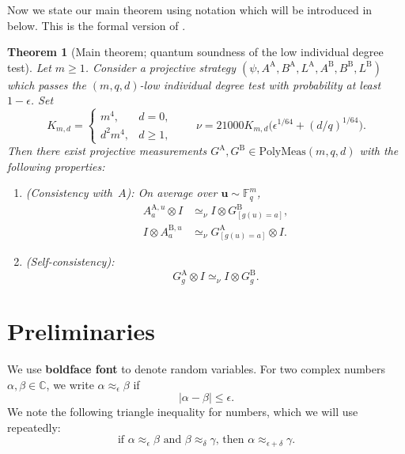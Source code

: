 \documentclass[11pt]{article}
\newtheorem{theorem}{Theorem}[section]
\theoremstyle{definition}
\newcommand{\C}{\mathbb C}
\newcommand{\F}{\mathbb F}
\newcommand{\eps}{\epsilon}
\newcommand{\ot}{\otimes}
\newcommand{\bu}{\boldsymbol{u}}
\newcommand{\polymeas}[3]{\mathrm{PolyMeas}(#1, #2, #3)}
\begin{document}
Now we state our main theorem using notation which will be introduced in  below.
This is the formal version of .

\begin{theorem}[Main theorem; quantum soundness of the low individual degree test]\label{thm:main-formal}
  Let $m\geq1$.  Consider a projective strategy $(\psi, A^{\mathrm{A}},B^{\mathrm{A}},L^{\mathrm{A}},A^{\mathrm{B}},B^{\mathrm{B}},L^{\mathrm{B}})$
   which passes the  $(m,q,d)$-low individual degree test with probability at least $1-\eps$.
  Set
  \[
  K_{m,d}=
  \begin{cases}
    m^4,&d=0,\\
    d^2m^4,&d\geq1,
  \end{cases}
  \qquad
  \nu = 21000 K_{m,d}
  \Big(\eps^{1/64} + (d/q)^{1/64}\Big).
  \]
Then there exist projective measurements $G^{\mathrm{A}}, G^{\mathrm{B}} \in \polymeas{m}{q}{d}$ with the following properties:
\begin{enumerate}
  \item (Consistency with~$A$):  On average over $\bu \sim \F_q^{m}$,
	  \begin{align*}
	  A^{\mathrm{A},u}_a \otimes I
		&\simeq_{\nu} I \otimes G^{\mathrm{B}}_{[g(u)=a]},\\
	I \otimes A^{\mathrm{B},u}_a
		&\simeq_{\nu}  G^{\mathrm{A}}_{[g(u)=a]} \ot I.
	  \end{align*}
\item (Self-consistency):
	\begin{equation*}
	G^{\mathrm{A}}_g \ot I \simeq_{\nu} I \ot G^{\mathrm{B}}_g.
	\end{equation*}
\end{enumerate}
\end{theorem}

\section{Preliminaries}\label{sec:prelims}

We use \textbf{boldface font} to denote random variables.
For two complex numbers $\alpha, \beta \in \C$, we write
$\alpha \approx_{\eps} \beta$ if
\begin{equation*}
|\alpha - \beta| \leq \eps.
\end{equation*}
We note the following triangle inequality for numbers, which we will use repeatedly:
\begin{equation}\label{eq:triangle-inequality-for-numbers}
\text{if $\alpha \approx_{\eps} \beta$ and $\beta \approx_{\delta} \gamma$, then $\alpha \approx_{\eps+\delta}\gamma$.}
\end{equation}
\end{document}
